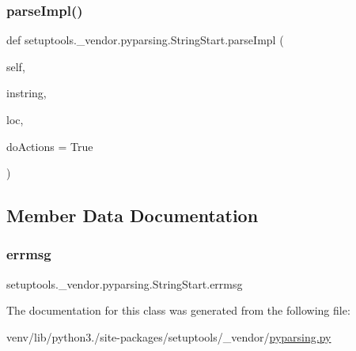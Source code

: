 \subsubsection{\texorpdfstring{parse\+Impl()}{parseImpl()}}
{\footnotesize\ttfamily def setuptools.\+\_\+vendor.\+pyparsing.\+String\+Start.\+parse\+Impl (\begin{DoxyParamCaption}\item[{}]{self,  }\item[{}]{instring,  }\item[{}]{loc,  }\item[{}]{do\+Actions = {\ttfamily True} }\end{DoxyParamCaption})}



\subsection{Member Data Documentation}
\mbox{\label{classsetuptools_1_1__vendor_1_1pyparsing_1_1StringStart_aa9d18ab5768e58a127fe5e09def2ce0f}} 
\subsubsection{\texorpdfstring{errmsg}{errmsg}}
{\footnotesize\ttfamily setuptools.\+\_\+vendor.\+pyparsing.\+String\+Start.\+errmsg}



The documentation for this class was generated from the following file\+:\begin{DoxyCompactItemize}
\item 
venv/lib/python3./site-\/packages/setuptools/\+\_\+vendor/\hyperlink{setuptools_2__vendor_2pyparsing_8py}{pyparsing.\+py}\end{DoxyCompactItemize}
